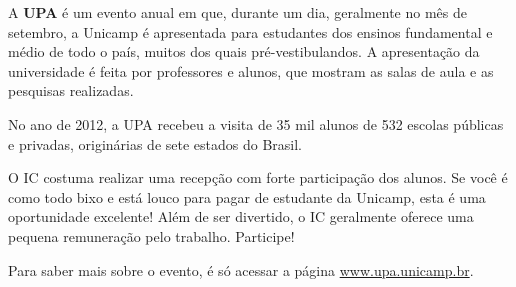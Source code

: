 A \textbf{UPA} é um evento anual em que, durante um dia, geralmente no mês de
setembro, a Unicamp é apresentada para estudantes dos ensinos fundamental e
médio de todo o país, muitos dos quais pré-vestibulandos. A apresentação da
universidade é feita por professores e alunos, que mostram as salas de aula e as
pesquisas realizadas.

No ano de 2012, a UPA recebeu a visita de 35 mil alunos de 532 escolas públicas
e privadas, originárias de sete estados do Brasil.

O IC costuma realizar uma recepção com forte participação dos alunos. Se você é
como todo bixo e está louco para pagar de estudante da Unicamp, esta é uma
oportunidade excelente! Além de ser divertido, o IC geralmente oferece uma
pequena remuneração pelo trabalho. Participe!

Para saber mais sobre o evento, é só acessar a página \url{www.upa.unicamp.br}.
